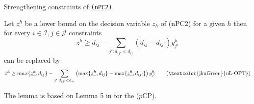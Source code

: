 \documentclass[utf8,aspectratio=1610,ngerman,english]{beamer}
\renewcommand{\emph}[1]{\textcolor{jkuGreen}{#1}}
\newcommand{\nPC}{\hyperref[eq:nPC]{\texttt{(nPC1)}}\xspace}
\newcommand{\nPCE}{\hyperref[eq:nPCE]{\texttt{(nPC3)}}\xspace}
\newcommand{\nPCY}{\hyperref[eq:nPCY]{\texttt{(nPC2)}}\xspace}
\newcommand{\pCP}{($p$CP)\xspace}
\begin{document}
\begin{frame}{Strengthening constraints of \nPCY} \pause
    \vspace{-2pt}
    \begin{lemma}\label{theorem:strength}
        Let $\underline{z^h}$ be a lower bound on the decision variable $z_h$ of (nPC2) for a given $h$ then for every $i \in \mathcal I, j \in \mathcal J$ constraints \pause
        \begin{equation*}
            z^{h} \geq d_{ij} - \sum_{j':d_{ij'} < d_{ij}}(d_{ij} - d_{ij'})y_{j'}^h
        \end{equation*}
        can be replaced by \pause
        \begin{equation}
            z^h \geq max\{\underline{z^h}, d_{ij}\} - \sum_{j':d_{ij'} < d_{ij}} \left(\max \{\underline{z^h}, d_{ij}\} - \max \{\underline{z^h}, d_{ij'}\}\right)y_{j'}^h  \label{eq:nPC2-lift} \tag{\emph{nL-OPT}}
        \end{equation}
    \end{lemma}
    The lemma is based on Lemma 5 in \citet{GAAR2022} for the \pCP.
\end{frame}

\end{document}
